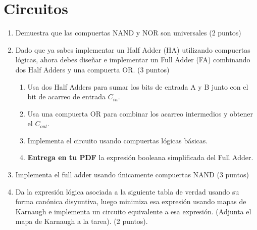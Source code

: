 \section*{Circuitos}

\begin{enumerate}
    \item Demuestra que las compuertas NAND y NOR son universales (2 puntos)
    \item Dado que ya sabes implementar un Half Adder (HA) utilizando compuertas lógicas, ahora debes diseñar e implementar un Full Adder (FA) combinando dos Half Adders y una compuerta OR. (3 puntos)
    \begin{enumerate}
        \item Usa dos Half Adders para sumar los bits de entrada A y B junto con el bit de acarreo de entrada $C_{in}$.
        \item Usa una compuerta OR para combinar los acarreo intermedios y obtener el $C_{out}$.
        \item Implementa el circuito usando compuertas lógicas básicas.
        \item \textbf{Entrega en tu PDF} la expresión booleana simplificada del Full Adder.
    \end{enumerate}
    \item Implementa el full adder usando únicamente compuertas NAND (3 puntos)
    \item Da la expresión lógica asociada a la siguiente tabla de verdad usando su forma canónica disyuntiva, luego minimiza esa expresión usando mapas de Karnaugh e implementa un circuito equivalente a esa expresión. (Adjunta el mapa de Karnaugh a la tarea). (2 puntos).


\end{enumerate}
